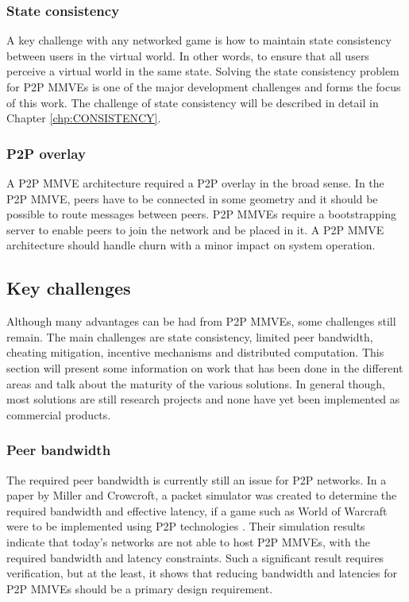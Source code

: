 \subsubsection{State consistency}

A key challenge with any networked game is how to maintain state consistency between users in the virtual world. In other words, to ensure that all users perceive a virtual world in the same state. Solving the state consistency problem for P2P MMVEs is one of the major development challenges and forms the focus of this work. The challenge of state consistency will be described in detail in Chapter \ref{chp:CONSISTENCY}.

\subsubsection{P2P overlay}

A P2P MMVE architecture required a P2P overlay in the broad sense. In the P2P MMVE, peers have to be connected in some geometry and it should be possible to route messages between peers. P2P MMVEs require a bootstrapping server to enable peers to join the network and be placed in it. A P2P MMVE architecture should handle churn with a minor impact on system operation.

\subsection{Key challenges}
\label{key_challenges}

Although many advantages can be had from P2P MMVEs, some challenges still remain. The main challenges are state consistency, limited peer bandwidth, cheating mitigation, incentive mechanisms and distributed computation. This section will present some information on work that has been done in the different areas and talk about the maturity of the various solutions. In general though, most solutions are still research projects and none have yet been implemented as commercial products.

\subsubsection{Peer bandwidth}

The required peer bandwidth is currently still an issue for P2P networks. In a paper by Miller and Crowcroft, a packet simulator was created to determine the required bandwidth and effective latency, if a game such as World of Warcraft were to be implemented using P2P technologies \cite{Miller_p2p_infeasability}. Their simulation results indicate that today's networks are not able to host P2P MMVEs, with the required bandwidth and latency constraints. Such a significant result requires verification, but at the least, it shows that reducing bandwidth and latencies for P2P
MMVEs should be a primary design requirement.

